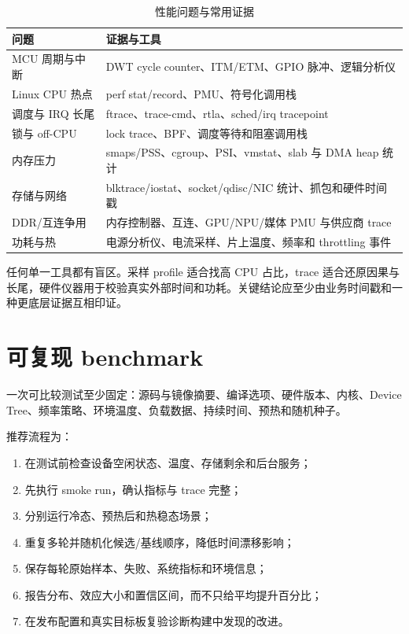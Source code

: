 \begin{table}[H]
  \centering
  \caption{性能问题与常用证据}
  \begin{tabular}{p{34mm}p{96mm}}
    \hline
    问题 & 证据与工具 \\
    \hline
    MCU 周期与中断 & DWT cycle counter、ITM/ETM、GPIO 脉冲、逻辑分析仪 \\
    Linux CPU 热点 & perf stat/record、PMU、符号化调用栈 \\
    调度与 IRQ 长尾 & ftrace、trace-cmd、rtla、sched/irq tracepoint \\
    锁与 off-CPU & lock trace、BPF、调度等待和阻塞调用栈 \\
    内存压力 & smaps/PSS、cgroup、PSI、vmstat、slab 与 DMA heap 统计 \\
    存储与网络 & blktrace/iostat、socket/qdisc/NIC 统计、抓包和硬件时间戳 \\
    DDR/互连争用 & 内存控制器、互连、GPU/NPU/媒体 PMU 与供应商 trace \\
    功耗与热 & 电源分析仪、电流采样、片上温度、频率和 throttling 事件 \\
    \hline
  \end{tabular}
\end{table}

任何单一工具都有盲区。采样 profile 适合找高 CPU 占比，trace 适合还原因果与长尾，硬件仪器用于校验真实外部时间和功耗。关键结论应至少由业务时间戳和一种更底层证据互相印证。

\section{可复现 benchmark}

一次可比较测试至少固定：源码与镜像摘要、编译选项、硬件版本、内核、Device Tree、频率策略、环境温度、负载数据、持续时间、预热和随机种子。

推荐流程为：

\begin{enumerate}
  \item 在测试前检查设备空闲状态、温度、存储剩余和后台服务；
  \item 先执行 smoke run，确认指标与 trace 完整；
  \item 分别运行冷态、预热后和热稳态场景；
  \item 重复多轮并随机化候选/基线顺序，降低时间漂移影响；
  \item 保存每轮原始样本、失败、系统指标和环境信息；
  \item 报告分布、效应大小和置信区间，而不只给平均提升百分比；
  \item 在发布配置和真实目标板复验诊断构建中发现的改进。
\end{enumerate}

